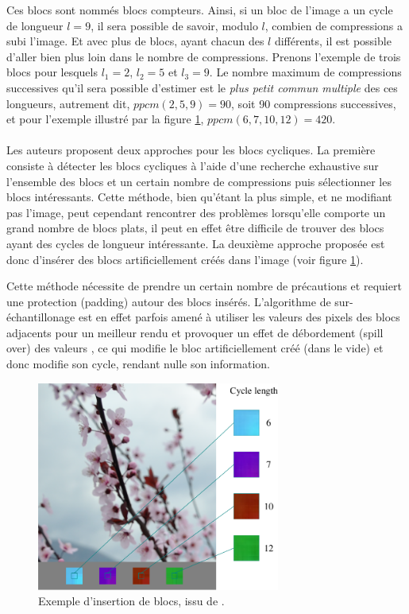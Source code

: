 \documentclass[utf8,final]{stageM2R} %
\begin{document}
Ces blocs sont nommés blocs compteurs. Ainsi, si un bloc de l'image a un cycle de longueur $l=9$, il sera possible de savoir, modulo $l$, combien de compressions a subi l'image. Et avec plus de blocs, ayant chacun des $l$ différents, il est possible d'aller bien plus loin dans le nombre de compressions. Prenons l'exemple de trois blocs pour lesquels $l_{1} = 2$, $l_{2} = 5$ et $l_{3} = 9$. Le nombre maximum de compressions successives qu'il sera possible d'estimer est le \textit{plus petit commun multiple} des ces longueurs, autrement dit, $ppcm(2, 5, 9) = 90$, soit 90 compressions successives, et pour l'exemple illustré par la figure \ref{fig:insertion_blocs}, $ppcm(6, 7, 10, 12) = 420$.

\paragraph{}
Les auteurs proposent deux approches pour les blocs cycliques. La première consiste à détecter les blocs cycliques à l'aide d'une recherche exhaustive sur l'ensemble des blocs et un certain nombre de compressions puis sélectionner les blocs intéressants. Cette méthode, bien qu'étant la plus simple, et ne modifiant pas l'image, peut cependant rencontrer des problèmes lorsqu'elle comporte un grand nombre de blocs plats, il peut en effet être difficile de trouver des blocs ayant des cycles de longueur intéressante. La deuxième approche proposée est donc d'insérer des blocs artificiellement créés dans l'image (voir figure \ref{fig:insertion_blocs}). 

Cette méthode nécessite de prendre un certain nombre de précautions et requiert une protection (padding) autour des blocs insérés. L'algorithme de sur-échantillonage est en effet parfois amené à utiliser les valeurs des pixels des blocs adjacents pour un meilleur rendu et provoquer un effet de débordement (spill over) des valeurs \autocite{carnein2015forensics}, ce qui modifie le bloc artificiellement créé (dans le vide) et donc modifie son cycle, rendant nulle son information.

\begin{figure}[H]
  \begin{center}
    \includegraphics[width=80mm]{images/insertion_blocs}
    \caption{Exemple d'insertion de blocs, issu de \autocite{CarneinSB2016TelltaleWatermarks}.}
    \label{fig:insertion_blocs}
  \end{center}
\end{figure}
\end{document}
